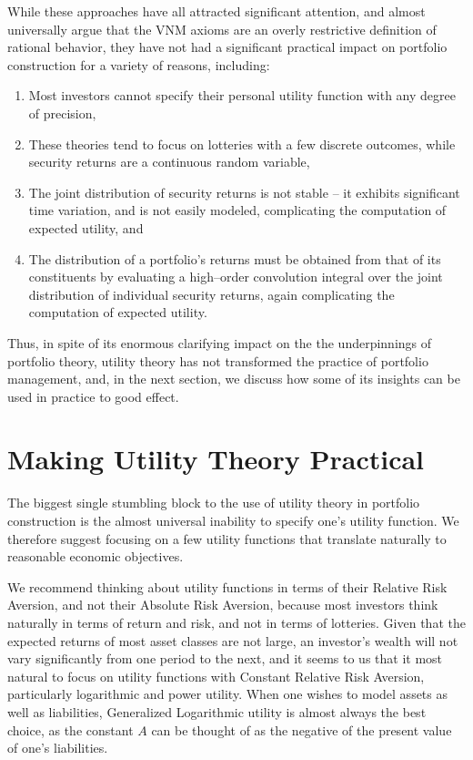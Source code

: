 \documentclass[graybox,envcountchap,sectrefs]{svmono}\usepackage[]{graphicx}\usepackage[]{xcolor}
\begin{document}
\begin{appendices}
While these approaches have all attracted significant attention, and
almost universally argue that the VNM axioms are an overly restrictive
definition of rational behavior, they have not had a significant practical
impact on portfolio construction for a variety of reasons, including:
\begin{enumerate}
\item Most investors cannot specify their personal utility function with
any degree of precision,
\item These theories tend to focus on lotteries with a few discrete outcomes,
while security returns are a continuous random variable,
\item The joint distribution of security returns is not stable -- it exhibits
significant time variation, and is not easily modeled, complicating
the computation of expected utility, and
\item The distribution of a portfolio's returns must be obtained from that
of its constituents by evaluating a high--order convolution integral
over the joint distribution of individual security returns, again
complicating the computation of expected utility.
\end{enumerate}
Thus, in spite of its enormous clarifying impact on the the underpinnings
of portfolio theory, utility theory has not transformed the practice
of portfolio management, and, in the next section, we discuss how
some of its insights can be used in practice to good effect. 

\section{Making Utility Theory Practical\label{sec:MakingUtiliyTheoryPractical}}

The biggest single stumbling block to the use of utility theory in
portfolio construction is the almost universal inability to specify
one's utility function. We therefore suggest focusing on a few utility
functions that translate naturally to reasonable economic objectives.

We recommend thinking about utility functions in terms of their Relative
Risk Aversion, and not their Absolute Risk Aversion, because most
investors think naturally in terms of return and risk, and not in
terms of lotteries. Given that the expected returns of most asset
classes are not large, an investor's wealth will not vary significantly
from one period to the next, and it seems to us that it most natural
to focus on utility functions with Constant Relative Risk Aversion,
particularly logarithmic and power utility. When one wishes to model
assets as well as liabilities, Generalized Logarithmic utility is
almost always the best choice, as the constant $A$ can be thought
of as the negative of the present value of one's liabilities. 


\end{appendices}
\end{document}
